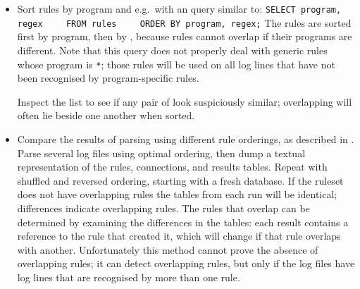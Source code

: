 \begin{itemize}

    \item Sort rules by program and  e.g.\ with an
         query similar to:                 \newline{}
        \verb!SELECT program, regex!                    \newline{}
        \verb!    FROM rules!                           \newline{}
        \verb!    ORDER BY program, regex;!             \newline{}
        The rules are sorted first by program, then by ,
        because rules cannot overlap if their programs are different.  Note
        that this query does not properly deal with generic rules whose
        program is \texttt{*}; those rules will be used on all log lines
        that have not been recognised by program-specific rules.

        Inspect the list to see if any pair of \regexes{} look suspiciously
        similar; overlapping \regexes{} will often lie beside one another
        when sorted.

    \item Compare the results of parsing using different rule orderings, as
        described in .  Parse
        several log files using optimal ordering, then dump a textual
        representation of the rules, connections, and results tables.
        Repeat with shuffled and reversed ordering, starting with a fresh
        database.  If the ruleset does not have overlapping rules the
        tables from each run will be identical; differences indicate
        overlapping rules.  The rules that overlap can be determined by
        examining the differences in the tables: each result contains a
        reference to the rule that created it, which will change if that
        rule overlaps with another.  Unfortunately this method cannot prove
        the absence of overlapping rules; it can detect overlapping rules,
        but only if the log files have log lines that are recognised by
        more than one rule.

\end{itemize}



\newpage{}

